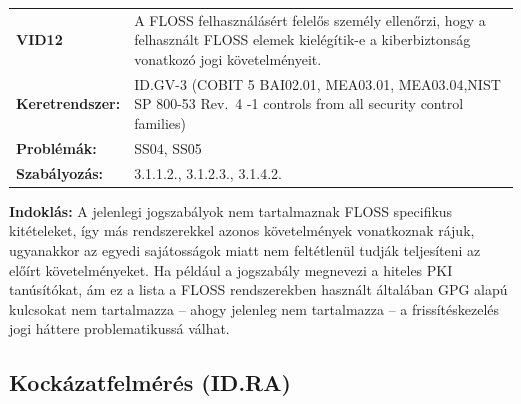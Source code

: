 \documentclass[12pt,magyar,a4paper,oneside]{scrreprt}
\begin{document}
\begin{longtable}[]{@{}ll@{}}
\toprule
\endhead
\begin{minipage}[t]{0.16\columnwidth}\raggedright
\textbf{VID12}\strut
\end{minipage} & \begin{minipage}[t]{0.79\columnwidth}\raggedright
A FLOSS felhasználásért felelős személy ellenőrzi, hogy a felhasznált
FLOSS elemek kielégítik-e a kiberbiztonság vonatkozó jogi
követelményeit.\strut
\end{minipage}\tabularnewline
\begin{minipage}[t]{0.16\columnwidth}\raggedright
\textbf{Keretrendszer:}\strut
\end{minipage} & \begin{minipage}[t]{0.79\columnwidth}\raggedright
ID.GV-3 (COBIT 5 BAI02.01, MEA03.01, MEA03.04,NIST SP 800-53 Rev.~4 -1
controls from all security control families)\strut
\end{minipage}\tabularnewline
\begin{minipage}[t]{0.16\columnwidth}\raggedright
\textbf{Problémák:}\strut
\end{minipage} & \begin{minipage}[t]{0.79\columnwidth}\raggedright
SS04, SS05\strut
\end{minipage}\tabularnewline
\begin{minipage}[t]{0.16\columnwidth}\raggedright
\textbf{Szabályozás:}\strut
\end{minipage} & \begin{minipage}[t]{0.79\columnwidth}\raggedright
3.1.1.2., 3.1.2.3., 3.1.4.2.\strut
\end{minipage}\tabularnewline
\bottomrule
\end{longtable}

\textbf{Indoklás: } A jelenlegi jogszabályok nem tartalmaznak FLOSS
specifikus kitételeket, így más rendszerekkel azonos követelmények
vonatkoznak rájuk, ugyanakkor az egyedi sajátosságok miatt nem
feltétlenül tudják teljesíteni az előírt követelményeket. Ha például a
jogszabály megnevezi a hiteles PKI tanúsítókat, ám ez a lista a FLOSS
rendszerekben használt általában GPG alapú kulcsokat nem tartalmazza --
ahogy jelenleg nem tartalmazza -- a frissítéskezelés jogi háttere
problematikussá válhat.

\hypertarget{kockuxe1zatfelmuxe9ruxe9s-id.ra}{%
\subsection{Kockázatfelmérés
(ID.RA)}\label{kockuxe1zatfelmuxe9ruxe9s-id.ra}}
\end{document}
